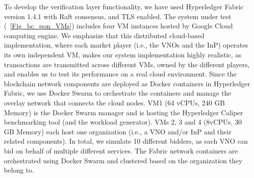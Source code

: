 To develop the verification layer functionality, we have used Hyperledger Fabric version 1.4.1 with Raft consensus, and \ac{TLS} enabled. The system under test (\figureautorefname~\ref{Fig_bc_pon_VMs}) includes four \ac{VM} instances hosted by Google Cloud computing engine. We emphasize that this distributed cloud-based implementation, where each market player (i.e., the \acp{VNO} and the \ac{InP}) operates its own independent \ac{VM}, makes our system implementation highly realistic, as transactions are transmitted across different \acp{VM}, owned by the different players, and enables us to test its performance on a real cloud environment. Since the blockchain network components are deployed as Docker containers in Hyperledger Fabric, we use Docker Swarm to orchestrate the containers and manage the overlay network that connects the cloud nodes.
VM1 (64 vCPUs, 240 GB Memory) is the Docker Swarm manager and is hosting the Hyperledger Caliper benchmarking tool (and the workload generator). \acp{VM} 2, 3 and 4 (8vCPUs, 30 GB Memory) each host one organization (i.e., a \ac{VNO} and/or \ac{InP} and their related components). In total, we simulate 10 different bidders, as each \ac{VNO} can bid on behalf of multiple different services. The Fabric network containers are orchestrated using Docker Swarm and clustered based on the organization they belong to. 

